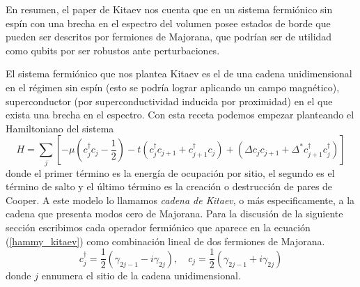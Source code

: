 En resumen, el paper de Kitaev \cite{YKitaev_2001} nos cuenta que en un sistema fermi\'{o}nico sin esp\'{i}n con una brecha en el espectro del volumen posee estados de borde que pueden ser descritos por fermiones de Majorana, que podr\'{i}an ser de utilidad como qubits por ser robustos ante perturbaciones.

El sistema fermi\'{o}nico que nos plantea Kitaev es el de una cadena unidimensional en el r\'{e}gimen sin esp\'{i}n (esto se podr\'{i}a lograr aplicando un campo magn\'{e}tico), superconductor (por superconductividad inducida por proximidad) en el que exista una brecha en el espectro. Con esta receta podemos empezar planteando el Hamiltoniano del sistema
\begin{equation}
      H=\sum_j [ -\mu (c_j^\dagger c_j - \frac{1}{2})-t(c_j^\dagger c_{j+1}+c_{j+1}^\dagger c_j) + (\Delta c_j c_{j+1}+\Delta^* c_{j+1}^\dagger c^\dagger_j)]
      \label{hammy_kitaev}
\end{equation}
donde el primer t\'{e}rmino es la energ\'{i}a de ocupaci\'{o}n por sitio, el segundo es el t\'{e}rmino de salto y el \'{u}ltimo t\'{e}rmino es la creaci\'{o}n o destrucci\'{o}n de pares de Cooper. A este modelo lo llamamos \emph{cadena de Kitaev}, o m\'{a}s especificamente, a la cadena que presenta modos cero de Majorana. 
Para la discusi\'{o}n de la siguiente secci\'{o}n escribimos cada operador fermi\'{o}nico que aparece en la ecuaci\'{o}n (\ref{hammy_kitaev}) como combinaci\'{o}n lineal de dos fermiones de Majorana.
\begin{equation}
    c_j^\dagger=\frac{1}{2}(\gamma_{2j-1}-i\gamma_{2j}),\quad c_j=\frac{1}{2}(\gamma_{2j-1}+i\gamma_{2j}) 
\end{equation}
donde $j$ ennumera el sitio de la cadena unidimensional.
%
%
